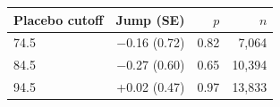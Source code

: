 \begin{tabular}{lrrr}
\toprule
Placebo cutoff & Jump (SE) & $p$ & $n$ \\
\midrule
74.5 & $-$0.16 (0.72) & 0.82 & 7,064 \\
84.5 & $-$0.27 (0.60) & 0.65 & 10,394 \\
94.5 & +0.02 (0.47) & 0.97 & 13,833 \\
\bottomrule
\end{tabular}
